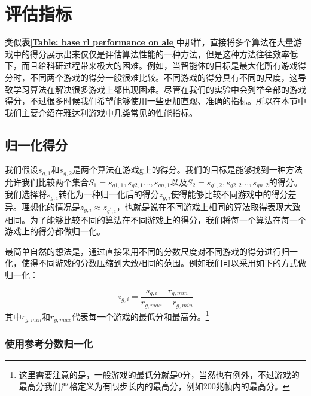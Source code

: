 \section{评估指标}
类似\textbf{表\ref{Table: base rl performance on ale}}中那样，直接将多个算法在大量游戏中的得分展示出来仅仅是评估算法性能的一种方法，但是这种方法往往效率低下，而且给科研过程带来极大的困难。例如，当智能体的目标是最大化所有游戏得分时，不同两个游戏的得分一般很难比较。不同游戏的得分具有不同的尺度，这导致学习算法在解决很多游戏上都出现困难。尽管在我们的实验中会列举全部的游戏得分，不过很多时候我们希望能够使用一些更加直观、准确的指标。所以在本节中我们主要介绍在雅达利游戏中几类常见的性能指标。

\subsection{归一化得分}
我们假设$s_{g,1}$和$s_{g,2}$是两个算法在游戏g上的得分。我们的目标是能够找到一种方法允许我们比较两个集合$S_1={s_{g1,1},s_{g2,1}\dots,s_{gn,1}}$以及$S_2={s_{g1,2},s_{g2,2}\dots,s_{gn,2}}$的得分。我们选择将$s_{g,i}$转化为一种归一化后的得分$z_{g,i}$使得能够比较不同游戏中的得分差异。理想化的情况是$z_{g,i}  \approx z_{g^{\prime},i}$，也就是说在不同游戏上相同的算法取得表现大致相同。为了能够比较不同的算法在不同游戏上的得分，我们将每一个算法在每一个游戏上的得分都做归一化。

最简单自然的想法是，通过直接采用不同的分数尺度对不同游戏的得分进行归一化，使得不同游戏的分数压缩到大致相同的范围。例如我们可以采用如下的方式做归一化：

\begin{equation}
    z_{g,i}=\frac{s_{g,i}-r_{g,min}}{r_{g,max}-r_{g,min}}
\end{equation}
其中$r_{g,min}$和$r_{g,max}$代表每一个游戏的最低分和最高分。\footnote{这里需要注意的是，一般游戏的最低分就是0分，当然也有例外，不过游戏的最高分我们严格定义为有限步长内的最高分，例如200兆帧内的最高分。}

\subsubsection{使用参考分数归一化}

